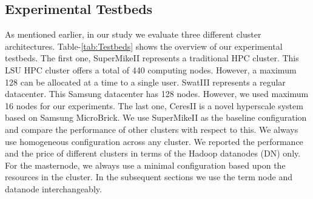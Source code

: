 \documentclass[journal]{IEEEtran}
\begin{document}
\subsection{Experimental Testbeds}
As mentioned earlier, in our study we evaluate three different cluster architectures. Table-\ref{tab:Testbeds} shows the overview of our experimental testbeds. The first one, SuperMikeII represents a traditional HPC cluster. This LSU HPC cluster oﬀers a total of 440 computing nodes. However, a maximum 128 can be allocated at a time to a single user. SwatIII represents a regular datacenter. This Samsung datacenter has 128 nodes. However, we used maximum 16 nodes for our experiments. The last one, CeresII is a novel hyperscale system based on Samsung MicroBrick. We use SuperMikeII as the baseline conﬁguration and compare the performance of other clusters with respect to this. We always use homogeneous conﬁguration across any cluster. We reported the performance and the price of diﬀerent clusters in terms of the Hadoop datanodes (DN) only. For the masternode, we always use a minimal configuration based upon the resources in the cluster. In the subsequent sections we use the term node and datanode interchangeably.
\end{document}
